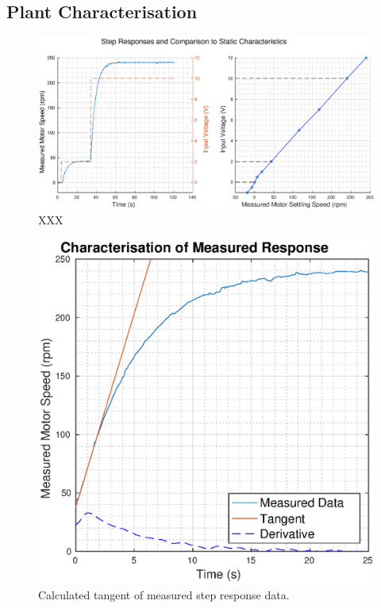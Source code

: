 \subsection{Plant Characterisation}

\begin{figure}
    \centering
    \includegraphics[width=\linewidth]{images/step_response}
    \caption{XXX}
\end{figure}

\begin{figure}[t]
    \centering
    \includegraphics[width=\imagewidth]{images/characterisation}
    \caption{Calculated tangent of measured step response data.}
    \label{fig:characterisation}
\end{figure}


